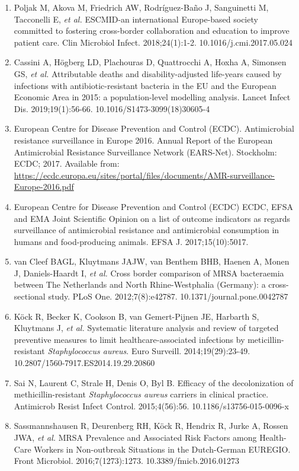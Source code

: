 \documentclass[
]{book}
\providecommand{\tightlist}{%
  \setlength{\itemsep}{0pt}\setlength{\parskip}{0pt}}
\begin{document}
\begin{enumerate}
\def\labelenumi{\arabic{enumi}.}
\tightlist
\item
  Poljak M, Akova M, Friedrich AW, Rodríguez-Baño J, Sanguinetti M, Tacconelli E, \emph{et al.} ESCMID-an international Europe-based society committed to fostering cross-border collaboration and education to improve patient care. Clin Microbiol Infect. 2018;24(1):1-2. 10.1016/j.cmi.2017.05.024
\item
  Cassini A, Högberg LD, Plachouras D, Quattrocchi A, Hoxha A, Simonsen GS, \emph{et al.} Attributable deaths and disability-adjusted life-years caused by infections with antibiotic-resistant bacteria in the EU and the European Economic Area in 2015: a population-level modelling analysis. Lancet Infect Dis. 2019;19(1):56-66. 10.1016/S1473-3099(18)30605-4
\item
  European Centre for Disease Prevention and Control (ECDC). Antimicrobial resistance surveillance in Europe 2016. Annual Report of the European Antimicrobial Resistance Surveillance Network (EARS-Net). Stockholm: ECDC; 2017. Available from: \url{https://ecdc.europa.eu/sites/portal/files/documents/AMR-surveillance-Europe-2016.pdf}
\item
  European Centre for Disease Prevention and Control (ECDC) ECDC, EFSA and EMA Joint Scientific Opinion on a list of outcome indicators as regards surveillance of antimicrobial resistance and antimicrobial consumption in humans and food-producing animals. EFSA J. 2017;15(10):5017.
\item
  van Cleef BAGL, Kluytmans JAJW, van Benthem BHB, Haenen A, Monen J, Daniels-Haardt I, \emph{et al.} Cross border comparison of MRSA bacteraemia between The Netherlands and North Rhine-Westphalia (Germany): a cross-sectional study. PLoS One. 2012;7(8):e42787. 10.1371/journal.pone.0042787
\item
  Köck R, Becker K, Cookson B, van Gemert-Pijnen JE, Harbarth S, Kluytmans J, \emph{et al.} Systematic literature analysis and review of targeted preventive measures to limit healthcare-associated infections by meticillin-resistant \emph{Staphylococcus aureus}. Euro Surveill. 2014;19(29):23-49. 10.2807/1560-7917.ES2014.19.29.20860
\item
  Sai N, Laurent C, Strale H, Denis O, Byl B. Efficacy of the decolonization of methicillin-resistant \emph{Staphylococcus aureus} carriers in clinical practice. Antimicrob Resist Infect Control. 2015;4(56):56. 10.1186/s13756-015-0096-x
\item
  Sassmannshausen R, Deurenberg RH, Köck R, Hendrix R, Jurke A, Rossen JWA, \emph{et al.} MRSA Prevalence and Associated Risk Factors among Health-Care Workers in Non-outbreak Situations in the Dutch-German EUREGIO. Front Microbiol. 2016;7(1273):1273. 10.3389/fmicb.2016.01273

\end{enumerate}
\end{document}
